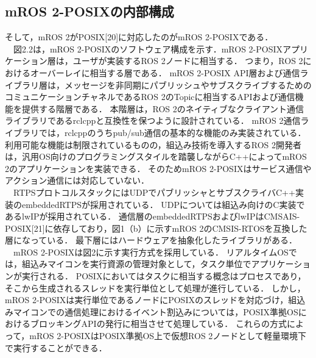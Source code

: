 \subsection{mROS 2-POSIXの内部構成}
そして，mROS 2がPOSIX[20]に対応したのがmROS 2-POSIXである．
\\　図2.2は，mROS 2-POSIXのソフトウェア構成を示す．mROS 2-POSIXアプリケーション層は，ユーザが実装するROS 2ノードに相当する．
つまり，ROS 2におけるオーバーレイに相当する層である．
mROS 2-POSIX API層および通信ライブラリ層は，メッセージを非同期にパブリッシュやサブスクライブするためのコミュニケーションチャネルであるROS 2のTopicに相当するAPIおよび通信機能を提供する階層である．
本階層は，ROS 2のネイティブなクライアント通信ライブラリであるrclcppと互換性を保つように設計されている．
mROS 2通信ライブラリでは，rclcppのうちpub/sub通信の基本的な機能のみ実装されている．
利用可能な機能は制限されているものの，組込み技術を導入するROS 2開発者は，汎用OS向けのプログラミングスタイルを踏襲しながらC++によってmROS 2のアプリケーションを実装できる．
そのためmROS 2-POSIXはサービス通信やアクション通信には対応していない．
\\　RTPSプロトコルスタックにはUDPでパブリッシャとサブスクライバC++実装のembeddedRTPSが採用されている．
UDPについては組込み向けのC実装であるlwIPが採用されている．
通信層のembeddedRTPSおよびlwIPはCMSAIS-POSIX[21]に依存しており，図1（b）に示すmROS 2のCMSIS-RTOSを互換した層になっている．
最下層にはハードウェアを抽象化したライブラリがある．
\\　mROS 2-POSIXは図2に示す実行方式を採用している．
リアルタイムOSでは，組込みマイコンを実行資源の管理対象として，タスク単位でアプリケーションが実行される．
POSIXにおいてはタスクに相当する概念はプロセスであり，そこから生成されるスレッドを実行単位として処理が進行している．
しかし，mROS 2-POSIXは実行単位であるノードにPOSIXのスレッドを対応づけ，組込みマイコンでの通信処理におけるイベント割込みについては，POSIX準拠OSにおけるブロッキングAPIの発行に相当させて処理している．
これらの方式によって，mROS 2-POSIXはPOSIX準拠OS上で仮想ROS 2ノードとして軽量環境下で実行することができる．
